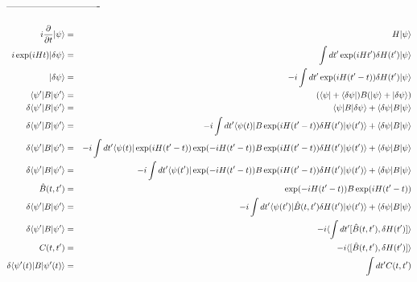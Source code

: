 \documentclass[12pt]{article}
\begin{document}
-------------------------

\begin{eqnarray}i{\partial\over\partial t}|\psi\rangle &=& H|\psi\rangle\\
i\exp(iHt)|\delta\psi\rangle &=& \int dt'\exp(iHt')\delta H(t')|\psi\rangle\\
|\delta\psi\rangle &=& -i\int dt'\exp(iH(t'-t))\delta H(t')|\psi\rangle\\
\langle\psi'|B|\psi'\rangle &=& (\langle\psi|+\langle\delta\psi|)B(|\psi\rangle+|\delta\psi\rangle)\\
\delta \langle\psi'|B|\psi'\rangle &=& \langle\psi|B|\delta\psi\rangle+\langle\delta\psi|B|\psi\rangle\\
\delta\langle\psi'|B|\psi'\rangle &=& -i\int dt'\langle\psi(t)|B\exp(iH(t'-t))\delta H(t')|\psi(t')\rangle+\langle\delta\psi|B|\psi\rangle\\
\delta\langle\psi'|B|\psi'\rangle &=& -i\int dt'\langle\psi(t)|\exp(iH(t'-t))\exp(-iH(t'-t))B\exp(iH(t'-t))\delta H(t')|\psi(t')\rangle+\langle\delta\psi|B|\psi\rangle\\
\delta\langle\psi'|B|\psi'\rangle &=& -i\int dt'\langle\psi(t')|\exp(-iH(t'-t))B\exp(iH(t'-t))\delta H(t')|\psi(t')\rangle+\langle\delta\psi|B|\psi\rangle\\
\hat{B}(t,t') &=& \exp(-iH(t'-t))B\exp(iH(t'-t))\\
\delta\langle\psi'|B|\psi'\rangle &=& -i\int dt'\langle\psi(t')|\hat{B}(t,t')\delta H(t')|\psi(t')\rangle+\langle\delta\psi|B|\psi\rangle\\
\delta\langle\psi'|B|\psi'\rangle &=& -i\langle\int dt'[\hat{B}(t,t'),\delta H(t')]\rangle\\
C(t,t') &=& -i\langle[\hat{B}(t,t'),\delta H(t')]\rangle\\
\delta\langle\psi'(t)|B|\psi'(t)\rangle &=& \int dt' C(t,t')
\end{eqnarray}
\end{document}
